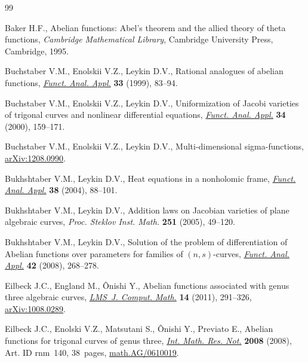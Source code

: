 \documentclass[pdftex]{sigma}
\numberwithin{equation}{section}
\begin{document}
\begin{thebibliography}{99}
\footnotesize\itemsep=0pt

Baker H.F., Abelian functions: Abel's theorem and the allied theory of theta
 functions, \textit{Cambridge Mathematical Library}, Cambridge University Press,
 Cambridge, 1995.

Buchstaber V.M., Enolskii V.Z., Leykin D.V., Rational analogues of abelian
 functions, \href{https://doi.org/10.1007/BF02465189}{\textit{Funct. Anal. Appl.}} \textbf{33} (1999), 83--94.

Buchstaber V.M., Enolskii V.Z., Leykin D.V., Uniformization of {J}acobi
 varieties of trigonal curves and nonlinear differential equations,
 \href{https://doi.org/10.1007/BF02482405}{\textit{Funct. Anal. Appl.}} \textbf{34} (2000), 159--171.

Buchstaber V.M., Enolskii V.Z., Leykin D.V., Multi-dimensional sigma-functions,
 \href{https://arxiv.org/abs/1208.0990}{arXiv:1208.0990}.

Bukhshtaber V.M., Leykin D.V., Heat equations in a nonholomic frame,
 \href{https://doi.org/10.1023/B:FAIA.0000034039.92913.8a}{\textit{Funct. Anal. Appl.}} \textbf{38} (2004), 88--101.

Bukhshtaber V.M., Leykin D.V., Addition laws on {J}acobian varieties of plane
 algebraic curves, \textit{Proc. Steklov Inst. Math.} \textbf{251} (2005),
 49--120.

Bukhshtaber V.M., Leykin D.V., Solution of the problem of differentiation of
 Abelian functions over parameters for families of {$(n,s)$}-curves,
 \href{https://doi.org/10.1007/s10688-008-0040-4}{\textit{Funct. Anal. Appl.}} \textbf{42} (2008), 268--278.

Eilbeck J.C., England M., \^Onishi Y., Abelian functions associated with genus
 three algebraic curves, \href{https://doi.org/10.1112/S1461157010000355}{\textit{LMS~J. Comput. Math.}} \textbf{14} (2011),
 291--326, \href{https://arxiv.org/abs/1008.0289}{arXiv:1008.0289}.

Eilbeck J.C., Enolski V.Z., Matsutani S., \^Onishi Y., Previato E., Abelian
 functions for trigonal curves of genus three, \href{https://doi.org/10.1093/imrn/rnm140}{\textit{Int. Math. Res. Not.}}
 \textbf{2008} (2008), Art. ID rnm~140, 38~pages, \href{https://arxiv.org/abs/math.AG/0610019}{math.AG/0610019}.


\end{thebibliography}
\end{document}
